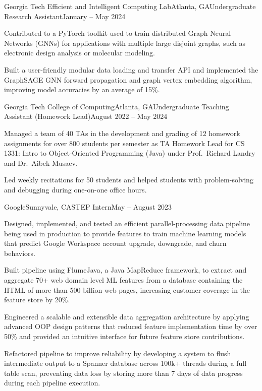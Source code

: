 \documentclass{article}
\begin{document}
\begin{flushleft}
    \begin{experience}{Georgia Tech Efficient and Intelligent Computing Lab}{Atlanta, GA}{Undergraduate Research Assistant}{January -- May 2024}
        \item Contributed to a PyTorch toolkit used to train distributed Graph Neural Networks (GNNs) for applications with multiple large disjoint graphs, such as electronic design analysis or molecular modeling.
        \item Built a user-friendly modular data loading and transfer API and implemented the GraphSAGE GNN forward propagation and graph vertex embedding algorithm, improving model accuracies by an average of 15\%.
    \end{experience}

    \begin{experience}{Georgia Tech College of Computing}{Atlanta, GA}{Undergraduate Teaching Assistant (Homework Lead)}{August 2022 -- May 2024}
        \item Managed a team of 40 TAs in the development and grading of 12 homework assignments for over 800 students per semester as TA Homework Lead for CS 1331: Intro to Object-Oriented Programming (Java) under Prof.~Richard Landry and Dr.~Aibek Musaev.
        \item Led weekly recitations for 50 students and helped students with problem-solving and debugging during one-on-one office hours.
    \end{experience}

    \begin{experience}{Google}{Sunnyvale, CA}{STEP Intern}{May -- August 2023}
        \item Designed, implemented, and tested an efficient parallel-processing data pipeline being used in production to provide features to train machine learning models that predict Google Workspace account upgrade, downgrade, and churn behaviors.
        \item Built pipeline using FlumeJava, a Java MapReduce framework, to extract and aggregate 70+ web domain level ML features from a database containing the HTML of more than 500 billion web pages, increasing customer coverage in the feature store by 20\%.
        \item Engineered a scalable and extensible data aggregation architecture by applying advanced OOP design patterns that reduced feature implementation time by over 50\% and provided an intuitive interface for future feature store contributions.
        \item Refactored pipeline to improve reliability by developing a system to flush intermediate output to a Spanner database across 100k+ threads during a full table scan, preventing data loss by storing more than 7 days of data progress during each pipeline execution.
    \end{experience}


\end{flushleft}
\end{document}

